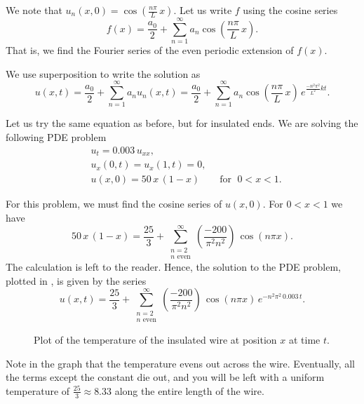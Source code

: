 We note that $u_n(x,0) = \cos \left( \frac{n \pi}{L} \, x \right)$.  Let us
write $f$ using the cosine series
\begin{equation*}
f(x) = \frac{a_0}{2} + \sum_{n=1}^\infty a_n \cos \left( \frac{n \pi}{L} \, x
\right) .
\end{equation*}
That is, we find the Fourier series of the even periodic extension of $f(x)$.

We use superposition to write the solution as
\begin{equation*}
\boxed{~~
u(x,t) = 
\frac{a_0}{2} + 
\sum_{n=1}^\infty
a_n
u_n(x,t)
=
\frac{a_0}{2} + 
\sum_{n=1}^\infty
a_n
\cos \left( \frac{n \pi}{L} \, x \right)
\, e^{\frac{-n^2 \pi^2}{L^2} k t} .
~~}
\end{equation*}

\begin{example}
Let us try the same equation as before, but for insulated ends.
We are solving the following PDE problem
\begin{align*}
& u_t = 0.003 \, u_{xx} , \\
& u_x(0,t) = u_x(1,t) = 0 , \\
& u(x,0) = 50\,x\,(1-x) \qquad \text{for } \; 0 < x < 1 .
\end{align*}

For this problem, we must find the cosine series of $u(x,0)$.
For $0 < x < 1$ we have
\begin{equation*}
50\, x\,(1-x)
=
\frac{25}{3} +
\sum_{\substack{n=2 \\ n \text{ even}}}^\infty
\left( \frac{-200}{\pi^2 n^2} \right) \,
\cos (n \pi x) .
\end{equation*}
The calculation is left to the reader.
Hence, the solution to the PDE problem, plotted in
, is given by the series
\begin{equation*}
u(x,t)
=
\frac{25}{3} +
\sum_{\substack{n=2 \\ n \text{ even}}}^\infty
\left( \frac{-200}{\pi^2 n^2} \right) \,
\cos ( n \pi x)
\, e^{-n^2 \pi^2 \, 0.003 \, t} .
\end{equation*}

\begin{figure}[h!t]
\capstart
\begin{center}
\caption{Plot of the temperature of the insulated wire at position $x$
at time $t$.\label{heat:wireisolexfig}}
\end{center}
\end{figure}

Note in the graph
that the temperature evens out across the wire.  Eventually, all the
terms except the constant
die out, and you will be left with a uniform temperature
of $\frac{25}{3} \approx 8.33$ along the entire length of the wire.
\end{example}

